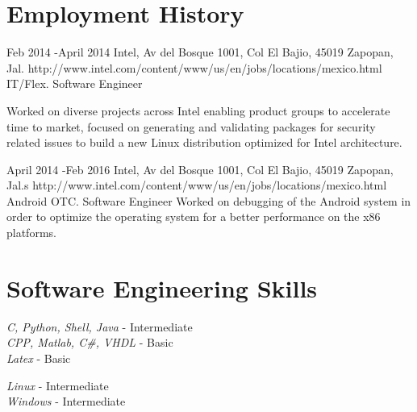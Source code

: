 \documentclass[10pt]{article} %
\begin{document}

\section{Employment History}

\job
{Feb 2014 -}{April 2014}
{Intel, Av del Bosque 1001, Col El Bajio, 45019 Zapopan, Jal.}
{http://www.intel.com/content/www/us/en/jobs/locations/mexico.html}
{IT/Flex. Software Engineer}
{Worked on diverse projects across Intel enabling product groups to accelerate time to market, focused on generating and validating packages for security related issues to build a new Linux distribution optimized for Intel architecture.\\
\rule{0mm}{5mm}
}


\job
{April 2014 -}{Feb 2016}
{Intel, Av del Bosque 1001, Col El Bajio, 45019 Zapopan, Jal.s}
{http://www.intel.com/content/www/us/en/jobs/locations/mexico.html}
{Android OTC. Software Engineer}
{Worked on debugging of the Android system in order to optimize the operating system for a better performance on the x86 platforms.}


\section{Software Engineering Skills}

{
\textit{C, Python, Shell, Java} - Intermediate\\
\textit{CPP, Matlab, C\#, VHDL} - Basic\\
\textit{Latex} - Basic\\
}

{
\textit{Linux} - Intermediate\\
\textit{Windows} - Intermediate\\
}
\end{document}
